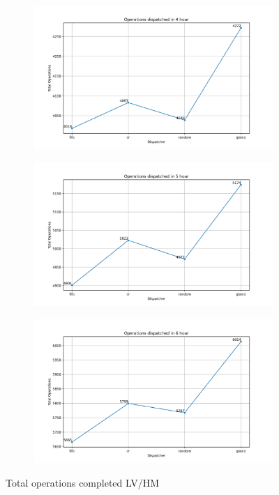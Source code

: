 \begin{figure}[ht]
\begin{subfigure}{0.32\textwidth}
	\end{subfigure}
	\begin{subfigure}{0.32\textwidth}
		\includegraphics[width=\textwidth]{LVHM/total_operations_14400s.png}
	\end{subfigure}\hfill
	\begin{subfigure}{0.32\textwidth}
		\includegraphics[width=\textwidth]{LVHM/total_operations_18000s.png}
	\end{subfigure}\hfill
	\begin{subfigure}{0.32\textwidth}
		\includegraphics[width=\textwidth]{LVHM/total_operations_21600s.png}
	\end{subfigure}
	\caption{Total operations completed LV/HM}
	\label{fig:totalopsLVHM}
\end{figure}


